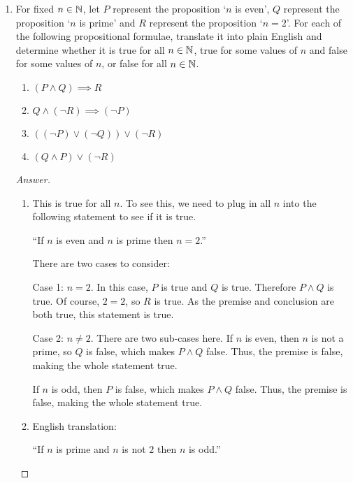 \documentclass[12pt]{amsart}
\begin{document}
\begin{enumerate}[label=\arabic*.,itemsep=10pt, leftmargin=*]
\item  
    For fixed $n\in \mathbb{N}$, let $P$ represent the proposition 
    `$n$ is even', $Q$ represent the proposition `$n$ is prime' and
    $R$ represent the proposition `$n = 2$'. 
    For each of the following propositional formulae, translate
    it into plain English and determine whether it is true for all 
    $n\in \mathbb{N}$, true for some values of $n$ and false for some values 
    of $n$, or false for all $n\in \mathbb{N}$.
    \begin{enumerate}[label=\alph*.,itemsep=5pt, leftmargin=*]
        \item $(P \wedge Q) \implies R$
        \item $ Q \wedge (\neg R) \implies (\neg P)$
        \item $ ((\neg P) \vee (\neg Q)) \vee (\neg R)$
        \item $ (Q \wedge P) \vee (\neg R)$
    \end{enumerate}
    \begin{proof}[Answer]
        \begin{enumerate}
            \item This is true for all $n$.
                To see this, we need to plug in all $n$ into the following statement
                to see if it is true.
                
                ``If $n$ is even and $n$ is prime then $n = 2$.''

                There are two cases to consider:

                Case 1: $n=2$. In this case, $P$ is true and $Q$ is true. Therefore
                $P \wedge Q$ is true. Of course, $2=2$, so $R$ is true.
                As the premise and conclusion are both true, this statement is true.

                Case 2: $n\not= 2$. There are two sub-cases here. 
                If $n$ is even, then $n$ is not a prime, so $Q$ is false, 
                which makes
                $P \wedge Q$ false. Thus, the premise is false, making the whole statement
                true.

                If $n$ is odd, then $P$ is false, 
                which makes
                $P \wedge Q$ false. Thus, the premise is false, making the whole statement
                true.

            \item English translation:

                ``If $n$ is prime and $n$ is not $2$ then $n$ is odd.''


\end{enumerate}
\end{proof}
\end{enumerate}
\end{document}

